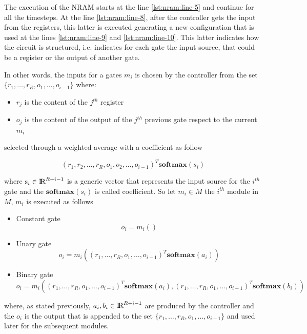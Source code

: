The execution of the NRAM starts at the line \ref{lst:nram:line-5} and continue for all the timesteps. At the line \ref{lst:nram:line-8}, after the controller gets the input from the registers, this latter is executed generating a new configuration that is used at the lines \ref{lst:nram:line-9} and \ref{lst:nram:line-10}. 
This latter indicates how the circuit is structured, i.e. indicates for each gate the input source, that could be a register or the output of another gate.

In other words, the inputs for a gates $m_i$ is chosen by the controller from the set $\{r_{1}, \dots, r_{R}, o_{1}, \dots, o_{i-1}\}$ where:
\begin{itemize}
	\item $r_j$ is the content of the $j^{th}$ register
	\item $o_j$ is the content of the output of the $j^{th}$ previous gate respect to the current $m_i$
\end{itemize}
selected through a weighted average with a coefficient as follow
\begin{center}
	\begin{equation}
		(r_1, r_2, \dots, r_R, o_1, o_2, \dots, o_{i-1})^T\textbf{softmax}(s_i)
	\end{equation}
\end{center}
where $\textrm{s}_i \in \textrm{I\!R}^{R+i-1}$ is a generic vector that represents the input source for the $i^{th}$ gate and the $\textbf{softmax}(s_i)$ is called coefficient. \newline
So let $m_i \in M$ the $i^{th}$ module in $M$, $m_i$ is executed as follows
\begin{itemize}
	\item{Constant gate
		\begin{equation}
			o_i = m_i()
		\end{equation}
	}
	\item{Unary gate
		\begin{equation}
			o_i = m_i((r_1, \dots, r_R, o_1, \dots, o_{i-1})^T\textbf{softmax}(a_i))
		\end{equation}
	}
	\item{Binary gate
		\begin{equation}
			o_i = m_i((r_1, \dots, r_R, o_1, \dots, o_{i-1})^T\textbf{softmax}(a_i), (r_1, \dots, r_R, o_1, \dots, o_{i-1})^T\textbf{softmax}(b_i))
		\end{equation}
	}
\end{itemize}
where, as stated previously, $a_i, b_i \in \textrm{I\!R}^{R+i-1}$ are produced by the controller and the $o_i$ is the output that is appended to the set $\{r_{1}, \dots, r_{R}, o_{1}, \dots, o_{i-1}\}$ and used later for the subsequent modules.

